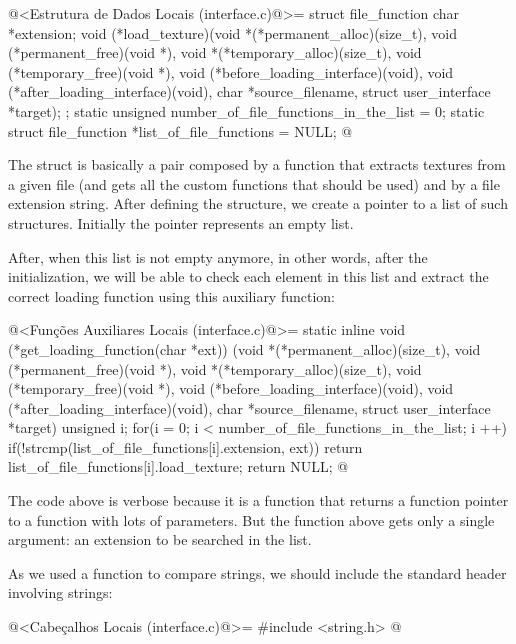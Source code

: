 \iniciocodigo
@<Estrutura de Dados Locais (interface.c)@>=
struct file_function {
  char *extension;
  void (*load_texture)(void *(*permanent_alloc)(size_t),
                      void (*permanent_free)(void *),
                      void *(*temporary_alloc)(size_t),
                      void (*temporary_free)(void *),
                      void (*before_loading_interface)(void),
                      void (*after_loading_interface)(void),
                      char *source_filename, struct user_interface *target);
};
static unsigned number_of_file_functions_in_the_list = 0;
static struct file_function *list_of_file_functions = NULL;
@
\fimcodigo

The struct is basically a pair composed by a function that extracts
textures from a given file (and gets all the custom functions that
should be used) and by a file extension string. After defining the
structure, we create a pointer to a list of such structures. Initially
the pointer represents an empty list.

After, when this list is not empty anymore, in other words, after the
initialization, we will be able to check each element in this list and
extract the correct loading function using this auxiliary function:

\iniciocodigo
@<Funções Auxiliares Locais (interface.c)@>=
static inline void (*get_loading_function(char *ext))
                          (void *(*permanent_alloc)(size_t),
                           void (*permanent_free)(void *),
                           void *(*temporary_alloc)(size_t),
                           void (*temporary_free)(void *),
                           void (*before_loading_interface)(void),
                           void (*after_loading_interface)(void),
                           char *source_filename, struct user_interface *target){
  unsigned i;
  for(i = 0; i < number_of_file_functions_in_the_list; i ++){
    if(!strcmp(list_of_file_functions[i].extension, ext))
      return list_of_file_functions[i].load_texture;
  }
  return NULL;
}
@
\fimcodigo

The code above is verbose because it is a function that returns a
function pointer to a function with lots of parameters. But the
function above gets only a single argument: an extension to be
searched in the list.

As we used a function to compare strings, we should include the
standard header involving strings:

\iniciocodigo
@<Cabeçalhos Locais (interface.c)@>=
#include <string.h>
@
\fimcodigo


